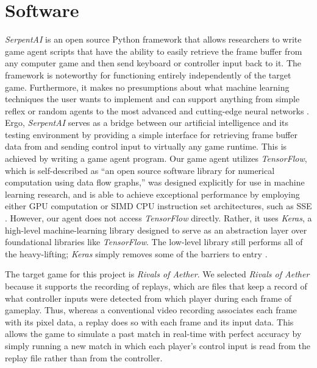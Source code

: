 


\section{Software}

{\it SerpentAI} is an open source Python framework that allows researchers to write game agent scripts that have the ability to easily retrieve the frame buffer from any computer game and then send keyboard or controller input back to it. The framework is noteworthy for functioning entirely independently of the target game. Furthermore, it makes no presumptions about what machine learning techniques the user wants to implement and can support anything from simple reflex or random agents to the most advanced and cutting-edge neural networks \cite{SerpentAI}. Ergo, {\it SerpentAI} serves as a bridge between our artificial intelligence and its testing environment by providing a simple interface for retrieving frame buffer data from and sending control input to virtually any game runtime. This is achieved by writing a game agent program. Our game agent utilizes {\it TensorFlow}, which is self-described as ``an open source software library for numerical computation using data flow graphs,'' was designed explicitly for use in machine learning research, and is able to achieve exceptional performance by employing either GPU computation or SIMD CPU instruction set architectures, such as SSE \cite{TensorFlow}. However, our agent does not access {\it TensorFlow} directly. Rather, it uses {\it Keras}, a high-level machine-learning library designed to serve as an abstraction layer over foundational libraries like {\it TensorFlow}. The low-level library still performs all of the heavy-lifting; {\it Keras} simply removes some of the barriers to entry \cite{Keras}.

The target game for this project is {\it Rivals of Aether}. We selected {\it Rivals of Aether} because it supports the recording of replays, which are files that keep a record of what controller inputs were detected from which player during each frame of gameplay. Thus, whereas a conventional video recording associates each frame with its pixel data, a replay does so with each frame and its input data. This allows the game to simulate a past match in real-time with perfect accuracy by simply running a new match in which each player's control input is read from the replay file rather than from the controller.

